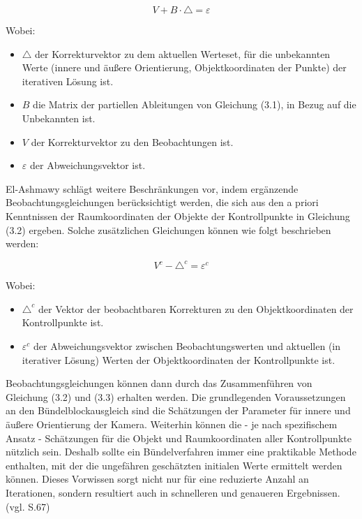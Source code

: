 \begin{equation}
V+B\cdot\triangle =\varepsilon
\end{equation}

Wobei:
\begin{itemize}
\item $\triangle$ der Korrekturvektor zu dem aktuellen Werteset, für die unbekannten Werte (innere und äußere Orientierung, Objektkoordinaten der Punkte) der iterativen Lösung ist.

\item $B$ die Matrix der partiellen Ableitungen von Gleichung (3.1), in Bezug auf die Unbekannten  ist.

\item $V$ der Korrekturvektor zu den Beobachtungen ist.

\item $\varepsilon$ der Abweichungsvektor ist.
\end{itemize}

El-Ashmawy \cite{comparative_conditions_study} schlägt weitere Beschränkungen vor, indem ergänzende Beobachtungsgleichungen berücksichtigt werden, die sich aus den a priori Kenntnissen der Raumkoordinaten der Objekte der Kontrollpunkte in Gleichung (3.2) ergeben. Solche zusätzlichen Gleichungen können wie folgt beschrieben werden:

\begin{equation}
V^c-\triangle^c = \varepsilon^c
\end{equation}

Wobei:

\begin{itemize}
\item $\triangle^c$ der Vektor der beobachtbaren Korrekturen zu den Objektkoordinaten der Kontrollpunkte ist.

\item $\varepsilon^c$ der Abweichungsvektor zwischen Beobachtungswerten und aktuellen (in iterativer Lösung) Werten der Objektkoordinaten der Kontrollpunkte ist.

\end{itemize}

Beobachtungsgleichungen können dann durch das Zusammenführen von Gleichung (3.2) und (3.3) erhalten werden. Die grundlegenden Voraussetzungen an den Bündelblockausgleich sind die Schätzungen der Parameter für innere und äußere Orientierung der Kamera. Weiterhin können die - je nach spezifischem Ansatz - Schätzungen für die Objekt und Raumkoordinaten aller Kontrollpunkte  nützlich sein. Deshalb sollte ein Bündelverfahren immer eine praktikable Methode enthalten, mit der die ungefähren geschätzten initialen Werte ermittelt werden können. Dieses Vorwissen sorgt nicht nur für eine reduzierte Anzahl an Iterationen, sondern resultiert auch in schnelleren und genaueren Ergebnissen. (vgl. \cite{comparative_conditions_study} S.67)


